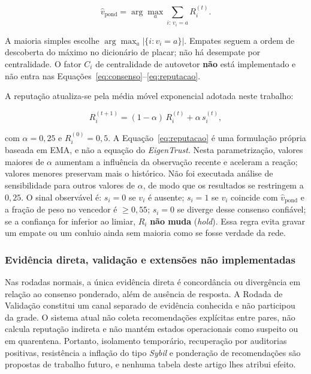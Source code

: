 \documentclass[12pt]{article}
\begin{document}
\begin{equation}
\label{eq:consenso}
\hat{v}_{\mathrm{pond}} = \arg\max_{a} \sum_{i:\, v_i = a} R_i^{(t)}.
\end{equation}

A maioria simples escolhe $\arg\max_{a} |\{i: v_i = a\}|$. Empates seguem a ordem de descoberta do máximo no dicionário de placar; não há desempate por centralidade. O fator $C_i$ de centralidade de autovetor \textbf{não} está implementado e não entra nas Equações~\ref{eq:consenso}--\ref{eq:reputacao}.

A reputação atualiza-se pela média móvel exponencial adotada neste trabalho:

\begin{equation}
\label{eq:reputacao}
R_i^{(t+1)} = (1-\alpha)\, R_i^{(t)} + \alpha\, s_i^{(t)},
\end{equation}

com $\alpha = 0{,}25$ e $R_i^{(0)} = 0{,}5$. A Equação~\ref{eq:reputacao} é uma formulação própria baseada em EMA, e não a equação do \textit{EigenTrust}. Nesta parametrização, valores maiores de $\alpha$ aumentam a influência da observação recente e aceleram a reação; valores menores preservam mais o histórico. Não foi executada análise de sensibilidade para outros valores de $\alpha$, de modo que os resultados se restringem a $0{,}25$. O sinal observável é: $s_i=0$ se $v_i$ é ausente; $s_i=1$ se $v_i$ coincide com $\hat{v}_{\mathrm{pond}}$ e a fração de peso no vencedor é $\geq 0{,}55$; $s_i=0$ se diverge desse consenso confiável; se a confiança for inferior ao limiar, $R_i$ \textbf{não muda} (\textit{hold}). Essa regra evita gravar um empate ou um conluio ainda sem maioria como se fosse verdade da rede.

\subsubsection{Evidência direta, validação e extensões não implementadas}

Nas rodadas normais, a única evidência direta é concordância ou divergência em relação ao consenso ponderado, além de ausência de resposta. A Rodada de Validação constitui um canal separado de evidência conhecida e não participou da grade. O sistema atual não coleta recomendações explícitas entre pares, não calcula reputação indireta e não mantém estados operacionais como suspeito ou em quarentena. Portanto, isolamento temporário, recuperação por auditorias positivas, resistência a inflação do tipo \textit{Sybil} e ponderação de recomendações são propostas de trabalho futuro, e nenhuma tabela deste artigo lhes atribui efeito.
\end{document}
